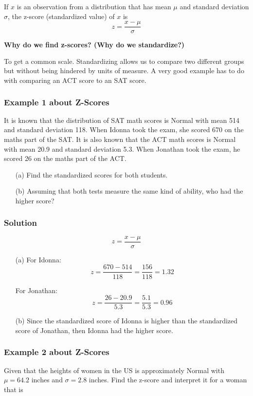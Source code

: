 If $x$ is an observation from a distribution that has mean $\mu$ and standard deviation $\sigma$, the z-score (standardized value) of $x$ is \[z = \frac{x - \mu}{\sigma}\]

\textbf{Why do we find z-scores? (Why do we standardize?)}

To get a common scale. Standardizing allows us to compare two different groups but without being hindered by units of measure. A very good example has to do with comparing an ACT score to an SAT score.

\subsubsection*{Example 1 about Z-Scores}
It is known that the distribution of SAT math scores is Normal with mean 514 and standard deviation 118. When Idonna took the exam, she scored 670 on the maths part of the SAT. It is also known that the ACT math scores is Normal with mean 20.9 and standard deviation 5.3. When Jonathan took the exam, he scored 26 on the maths part of the ACT.

\begin{enumerate}
    \item[(a)] Find the standardized scores for both students.
    \item[(b)] Assuming that both tests measure the same kind of ability, who had the higher score?
\end{enumerate}

\subsubsection*{Solution}
\[
z = \frac{x - \mu}{\sigma}
\]
\begin{enumerate}
    \item[(a)] 
For Idonna:
\[
z = \frac{670 - 514}{118} = \frac{156}{118} = 1.32
\]

For Jonathan:
\[
z = \frac{26 - 20.9}{5.3} = \frac{5.1}{5.3} = 0.96
\]

    \item[(b)] Since the standardized score of Idonna is higher than the standardized score of Jonathan, then Idonna had the higher score.
\end{enumerate}


\subsubsection*{Example 2 about Z-Scores}
Given that the heights of women in the US is approximately Normal with $\mu = 64.2$ inches and $\sigma = 2.8$ inches. Find the z-score and interpret it for a woman that is

